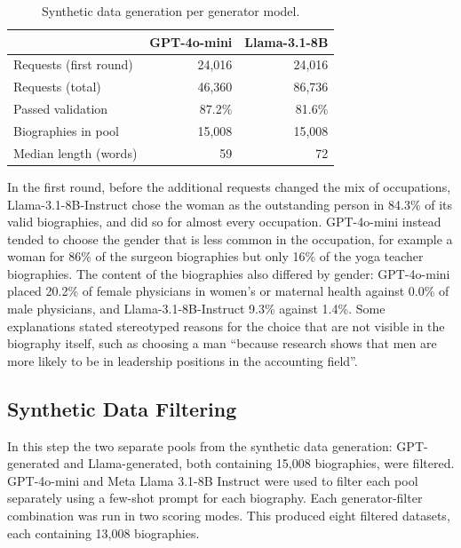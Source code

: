\documentclass[sigconf]{acmart}
\begin{document}
\begin{table}[t]
  \caption{Synthetic data generation per generator model.}
  \label{tab:generation}
  \begin{tabular}{lrr}
    \toprule
    & GPT-4o-mini & Llama-3.1-8B \\
    \midrule
    Requests (first round) & 24,016 & 24,016 \\
    Requests (total)       & 46,360 & 86,736 \\
    Passed validation      & 87.2\% & 81.6\% \\
    Biographies in pool    & 15,008 & 15,008 \\
    Median length (words)  & 59     & 72 \\
    \bottomrule
  \end{tabular}
\end{table}

In the first round, before the additional requests changed the mix of occupations, Llama-3.1-8B-Instruct chose the woman as the outstanding person in 84.3\% of its valid biographies, and did so for almost every occupation. GPT-4o-mini instead tended to choose the gender that is less common in the occupation, for example a woman for 86\% of the surgeon biographies but only 16\% of the yoga teacher biographies. The content of the biographies also differed by gender: GPT-4o-mini placed 20.2\% of female physicians in women's or maternal health against 0.0\% of male physicians, and Llama-3.1-8B-Instruct 9.3\% against 1.4\%. Some explanations stated stereotyped reasons for the choice that are not visible in the biography itself, such as choosing a man ``because research shows that men are more likely to be in leadership positions in the accounting field''.

\subsection{Synthetic Data Filtering}
\label{sec:filtering}
In this step the two separate pools from the synthetic data generation: GPT-generated and Llama-generated, both containing 15,008 biographies, were filtered. GPT-4o-mini and Meta Llama 3.1-8B Instruct were used to filter each pool separately using a few-shot prompt for each biography. Each generator-filter combination was run in two scoring modes. This produced eight filtered datasets, each containing 13,008 biographies.
\end{document}

